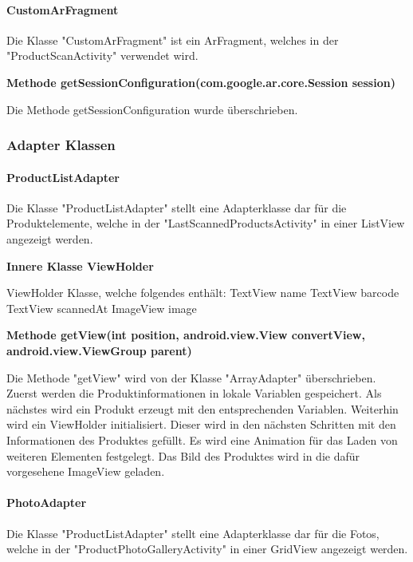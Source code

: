 \documentclass{scrartcl}
\begin{document}
\paragraph{CustomArFragment}
Die Klasse "CustomArFragment" ist ein ArFragment, welches in der "ProductScanActivity" verwendet wird. \newline 

\noindent\textbf{Methode getSessionConfiguration(com.google.ar.core.Session session)}

\noindent Die Methode getSessionConfiguration wurde überschrieben. \newline 

\subsubsection{Adapter Klassen}

\paragraph{ProductListAdapter}
Die Klasse "ProductListAdapter" stellt eine Adapterklasse dar für die Produktelemente, welche in der "LastScannedProductsActivity" in einer ListView angezeigt werden. \newline 

\noindent\textbf{Innere Klasse ViewHolder}

\noindent ViewHolder Klasse, welche folgendes enthält: TextView name TextView barcode TextView scannedAt ImageView image \newline 

\noindent\textbf{Methode getView(int position, \newline                                android.view.View convertView, android.view.ViewGroup parent)}

\noindent Die Methode "getView" wird von der Klasse "ArrayAdapter" überschrieben. Zuerst werden die Produktinformationen in lokale Variablen gespeichert. Als nächstes wird ein Produkt erzeugt mit den entsprechenden Variablen. Weiterhin wird ein ViewHolder initialisiert. Dieser wird in den nächsten Schritten mit den Informationen des Produktes gefüllt. Es wird eine Animation für das Laden von weiteren Elementen festgelegt. Das Bild des Produktes wird in die dafür vorgesehene ImageView geladen. \newline 


\paragraph{PhotoAdapter}
Die Klasse "ProductListAdapter" stellt eine Adapterklasse dar für die Fotos, welche in der "ProductPhotoGalleryActivity" in einer GridView angezeigt werden. \newline 
\end{document}

